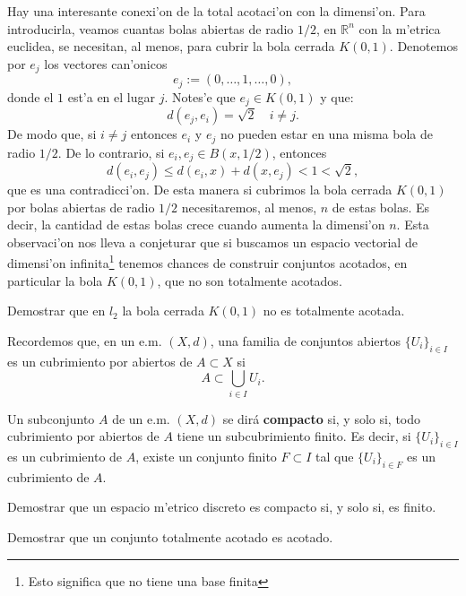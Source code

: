 \begin{ejemplo} Hay una interesante conexi'on de la total
acotaci'on con la dimensi'on. Para introducirla, veamos
 cuantas bolas abiertas de radio
$1/2$, en $\mathbb{R}^n$ con la m'etrica euclidea,
se necesitan, al menos,  para cubrir la bola cerrada $K(0,1)$.
Denotemos por $e_j$ los vectores can'onicos
\[
	e_j:=(0,\ldots,1,\ldots,0),
\]
donde el $1$ est'a en el lugar $j$. Notes'e que $e_j\in K(0,1)$ y que:
\[
	d(e_j,e_i)=\sqrt{2}\quad i\neq j.
\]
De modo que, si $i\neq j$ entonces $e_i$ y $e_j$ no pueden estar
en una misma bola de radio $1/2$. De lo contrario, si $e_i,e_j\in
B(x,1/2)$, entonces
\[
	d(e_i,e_j)\leq d(e_i,x)+d(x,e_j)<1<\sqrt{2},
\]
que es una contradicci'on. De esta manera si cubrimos la bola cerrada
$K(0,1)$ por bolas abiertas de radio $1/2$ necesitaremos, al menos,
$n$ de estas bolas. Es decir, la cantidad de estas bolas crece cuando aumenta
la dimensi'on $n$. Esta observaci'on nos lleva a conjeturar que si
buscamos un espacio vectorial de dimensi'on infinita\footnote{Esto significa
que no tiene una base finita} tenemos chances de construir conjuntos acotados,
en particular la bola $K(0,1)$, que no son totalmente acotados.

\begin{ejercicio} Demostrar que en $l_2$ la bola cerrada $K(0,1)$
no es totalmente acotada.
\end{ejercicio}
\end{ejemplo}


Recordemos que, en un e.m. $(X,d)$, una familia de conjuntos
abiertos $\{U_i\}_{i\in I}$ es un cubrimiento por abiertos de
$A\subset X$ si
\[
	A\subset\bigcup\limits_{i\in I}U_i.
\]
\begin{definicion} Un subconjunto $A$ de un e.m. $(X,d)$ se dir\'a
\textbf{compacto} si, y solo si, todo cubrimiento por abiertos de
$A$ tiene un subcubrimiento finito. Es decir, si $\{U_i\}_{i\in
I}$ es un cubrimiento  de $A$, existe un conjunto finito $F\subset
I$ tal que $\{U_i\}_{i\in F}$ es un cubrimiento de $A$.
\end{definicion}



\begin{ejercicio} Demostrar que un espacio m'etrico discreto es compacto
si, y solo si, es finito.
\end{ejercicio}

\begin{ejercicio} Demostrar que un conjunto totalmente acotado es
acotado.
\end{ejercicio}



